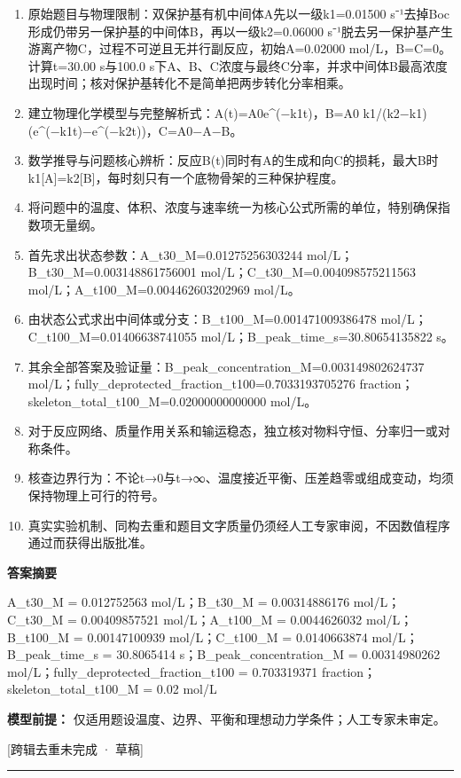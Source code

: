 \documentclass[UTF8,11pt,a4paper]{ctexart}
\begin{document}
\begin{enumerate}
\item 原始题目与物理限制：双保护基有机中间体A先以一级k1=0.01500 s⁻¹去掉Boc形成仍带另一保护基的中间体B，再以一级k2=0.06000 s⁻¹脱去另一保护基产生游离产物C，过程不可逆且无并行副反应，初始A=0.02000 mol/L，B=C=0。计算t=30.00 s与100.0 s下A、B、C浓度与最终C分率，并求中间体B最高浓度出现时间；核对保护基转化不是简单把两步转化分率相乘。
\item 建立物理化学模型与完整解析式：A(t)=A0e\textasciicircum{}(−k1t)，B=A0 k1/(k2−k1)(e\textasciicircum{}(−k1t)−e\textasciicircum{}(−k2t))，C=A0−A−B。
\item 数学推导与问题核心辨析：反应B(t)同时有A的生成和向C的损耗，最大B时k1[A]=k2[B]，每时刻只有一个底物骨架的三种保护程度。
\item 将问题中的温度、体积、浓度与速率统一为核心公式所需的单位，特别确保指数项无量纲。
\item 首先求出状态参数：A\_t30\_M=0.01275256303244 mol/L；B\_t30\_M=0.003148861756001 mol/L；C\_t30\_M=0.004098575211563 mol/L；A\_t100\_M=0.004462603202969 mol/L。
\item 由状态公式求出中间体或分支：B\_t100\_M=0.001471009386478 mol/L；C\_t100\_M=0.01406638741055 mol/L；B\_peak\_time\_s=30.80654135822 s。
\item 其余全部答案及验证量：B\_peak\_concentration\_M=0.003149802624737 mol/L；fully\_deprotected\_fraction\_t100=0.7033193705276 fraction；skeleton\_total\_t100\_M=0.02000000000000 mol/L。
\item 对于反应网络、质量作用关系和输运稳态，独立核对物料守恒、分率归一或对称条件。
\item 核查边界行为：不论t→0与t→∞、温度接近平衡、压差趋零或组成变动，均须保持物理上可行的符号。
\item 真实实验机制、同构去重和题目文字质量仍须经人工专家审阅，不因数值程序通过而获得出版批准。
\end{enumerate}
\noindent\textbf{答案摘要}\par
A\_t30\_M = 0.012752563 mol/L；B\_t30\_M = 0.00314886176 mol/L；C\_t30\_M = 0.00409857521 mol/L；A\_t100\_M = 0.0044626032 mol/L；B\_t100\_M = 0.00147100939 mol/L；C\_t100\_M = 0.0140663874 mol/L；B\_peak\_time\_s = 30.8065414 s；B\_peak\_concentration\_M = 0.00314980262 mol/L；fully\_deprotected\_fraction\_t100 = 0.703319371 fraction；skeleton\_total\_t100\_M = 0.02 mol/L\par
\noindent\textbf{模型前提：}
仅适用题设温度、边界、平衡和理想动力学条件；人工专家未审定。\par
\noindent\textcolor{red!65!black}{[跨辑去重未完成 · 草稿]} \par
\medskip\hrule\medskip
{}
\end{document}
